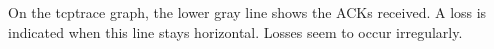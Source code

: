 On the tcptrace graph, the lower gray line shows the ACKs received. A loss is indicated when this line stays horizontal.
Losses seem to occur irregularly.